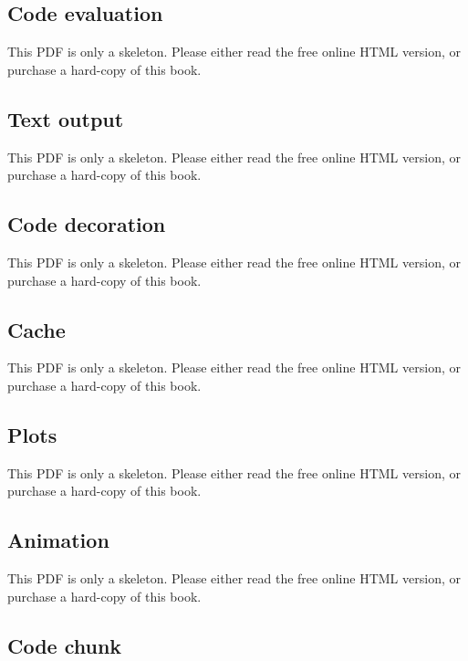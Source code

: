 \documentclass[
  11pt,
]{krantz}
\begin{document}
\subsection{Code evaluation}\label{code-evaluation}

This PDF is only a skeleton. Please either read the free online HTML version, or purchase a hard-copy of this book.

\subsection{Text output}\label{text-output}

This PDF is only a skeleton. Please either read the free online HTML version, or purchase a hard-copy of this book.

\subsection{Code decoration}\label{code-decoration}

This PDF is only a skeleton. Please either read the free online HTML version, or purchase a hard-copy of this book.

\subsection{Cache}\label{cache-options}

This PDF is only a skeleton. Please either read the free online HTML version, or purchase a hard-copy of this book.

\subsection{Plots}\label{plots}

This PDF is only a skeleton. Please either read the free online HTML version, or purchase a hard-copy of this book.

\subsection{Animation}\label{animation-options}

This PDF is only a skeleton. Please either read the free online HTML version, or purchase a hard-copy of this book.

\subsection{Code chunk}\label{code-chunk}
\end{document}
